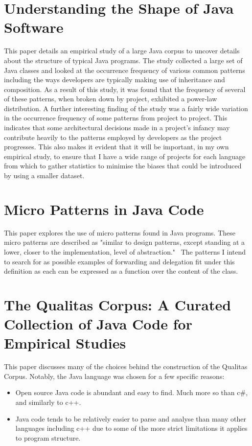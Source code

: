 \section{Understanding the Shape of Java Software~\cite{ShapeOfJava}}
This paper details an empirical study of a large Java corpus to uncover details about the structure of typical Java programs. The study collected a large set of Java classes and looked at the occurrence frequency of various common patterns including the ways developers are typically making use of inheritance and composition. As a result of this study, it was found that the frequency of several of these patterns, when broken down by project, exhibited a power-law distribution. \newline
A further interesting finding of the study was a fairly wide variation in the occurrence frequency of some patterns from project to project. This indicates that some architectural decisions made in a project's infancy may contribute heavily to the patterns employed by developers as the project progresses. This also makes it evident that it will be important, in my own empirical study, to ensure that I have a wide range of projects for each language from which to gather statistics to minimise the biases that could be introduced by using a smaller dataset.

\section{Micro Patterns in Java Code~\cite{JavaMicropatterns}}
This paper explores the use of micro patterns found in Java programs. These micro patterns are described as "similar to design patterns, except standing at a lower, closer to the implementation, level of abstraction."~\cite{JavaMicropatterns}\newline
The patterns I intend to search for as possible examples of forwarding and delegation fit under this definition as each can be expressed as a function over the content of the class.

\section{The Qualitas Corpus: A Curated Collection of Java Code for Empirical Studies~\cite{QualitasCorpus}}
This paper discusses many of the choices behind the construction of the Qualitas Corpus. Notably, the Java language was chosen for a few specific reasons:
\begin{itemize}
	\item Open source Java code is abundant and easy to find. Much more so than c\#, and similarly to c++.
	\item Java code tends to be relatively easier to parse and analyse than many other languages including c++ due to some of the more strict limitations it applies to program structure.
\end{itemize}

